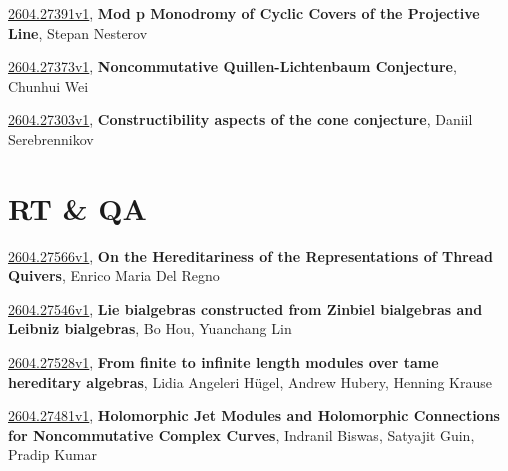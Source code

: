 \documentclass[9pt, a4paper]{article}
\theoremstyle{plain}
\theoremstyle{definition}
\theoremstyle{remark}
\newcommand{\arxiv}[3]{\href{https://arxiv.org/abs/#1}{#1}, \textbf{\textcolor{arxivblue}{#2}}, #3}
\begin{document}
\arxiv{2604.27391v1}{Mod p Monodromy of Cyclic Covers of the Projective Line}{Stepan Nesterov}

\arxiv{2604.27373v1}{Noncommutative Quillen-Lichtenbaum Conjecture}{Chunhui Wei}

\arxiv{2604.27303v1}{Constructibility aspects of the cone conjecture}{Daniil Serebrennikov}


\section{RT \& QA}
\arxiv{2604.27566v1}{On the Hereditariness of the Representations of Thread Quivers}{Enrico Maria Del Regno}

\arxiv{2604.27546v1}{Lie bialgebras constructed from Zinbiel bialgebras and Leibniz bialgebras}{Bo Hou, Yuanchang Lin}

\arxiv{2604.27528v1}{From finite to infinite length modules over tame hereditary algebras}{Lidia Angeleri Hügel, Andrew Hubery, Henning Krause}

\arxiv{2604.27481v1}{Holomorphic Jet Modules and Holomorphic Connections for Noncommutative Complex Curves}{Indranil Biswas, Satyajit Guin, Pradip Kumar}

\end{document}
